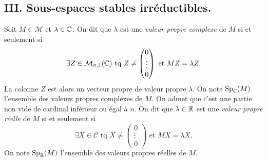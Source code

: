 \subsection*{III. Sous-espaces stables irréductibles.}
Soit $M\in\mathcal{M}$ et $\lambda \in \mathbb{C}$.\newline
On dit que $\lambda$ est une \emph{valeur propre complexe} de $M$ si et seulement si 
\[
 \exists Z \in \mathcal{M}_{n,1}(\mathbb{C}) \text{ tq } 
 Z \neq
 \begin{pmatrix}
  0 \\ \vdots \\ 0
 \end{pmatrix}
\text{ et }
MZ = \lambda Z.
\]
La colonne $Z$ est alors un vecteur propre de valeur propre $\lambda$. On note $\text{Sp}_{\mathbb{C}}(M)$ l'ensemble des valeurs propres complexes de $M$. On admet que c'est une partie non vide de cardinal inférieur ou égal à $n$.\newline
On dit que $\lambda \in \mathbb{R}$ est une \emph{valeur propre réelle} de $M$ si et seulement si 
\[
 \exists X \in \mathcal{C} \text{ tq } 
 X \neq
 \begin{pmatrix}
  0 \\ \vdots \\ 0
 \end{pmatrix}
\text{ et }
MX = \lambda X.
\]
On note $\text{Sp}_{\mathbb{R}}(M)$ l'ensemble des valeurs propres réelles de $M$.

